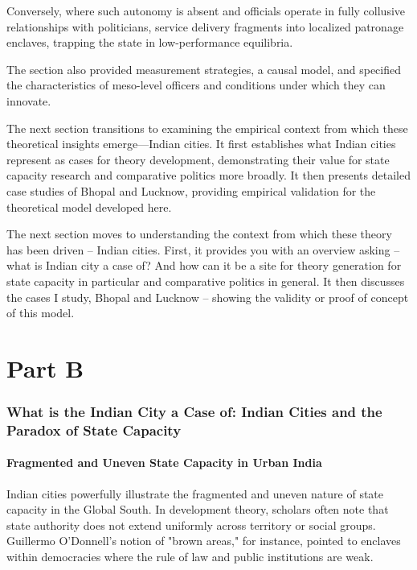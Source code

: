 Conversely, where such autonomy is absent and officials operate in fully collusive relationships with politicians, service delivery fragments into localized patronage enclaves, trapping the state in low-performance equilibria.

The section also provided measurement strategies, a causal model, and specified the characteristics of meso-level officers and conditions under which they can innovate.

The next section transitions to examining the empirical context from which these theoretical insights emerge—Indian cities. It first establishes what Indian cities represent as cases for theory development, demonstrating their value for state capacity research and comparative politics more broadly. It then presents detailed case studies of Bhopal and Lucknow, providing empirical validation for the theoretical model developed here.

The next section moves to understanding the context from which these theory has been driven – Indian cities. First, it provides you with an overview asking – what is Indian city a case of? And how can it be a site for theory generation for state capacity in particular and comparative politics in general. It then discusses the cases I study, Bhopal and Lucknow – showing the validity or proof of concept of this model.

\part{Part B}

\section{What is the Indian City a Case of: Indian Cities and the Paradox of State Capacity}

\subsection{Fragmented and Uneven State Capacity in Urban India}

Indian cities powerfully illustrate the fragmented and uneven nature of state capacity in the Global South. In development theory, scholars often note that state authority does not extend uniformly across territory or social groups. Guillermo O'Donnell's notion of "brown areas," for instance, pointed to enclaves within democracies where the rule of law and public institutions are weak.

